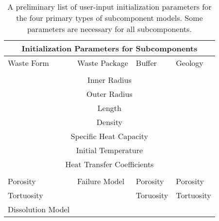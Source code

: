 %
\begin{table}
  \centering
  \footnotesize{
  \begin{tabularx}{\textwidth}{|l|l|l|l|}
    \multicolumn{4}{c}{\textbf{Initialization Parameters for Subcomponents}}\\
    \hline
    Waste Form & Waste Package & Buffer & Geology \\
    \hline
    \multicolumn{4}{|c|}{}\\
    \multicolumn{4}{|c|}{Inner Radius}\\
    \multicolumn{4}{|c|}{Outer Radius}\\
    \multicolumn{4}{|c|}{Length}\\
    \multicolumn{4}{|c|}{Density}\\
    \multicolumn{4}{|c|}{Specific Heat Capacity}\\
    \multicolumn{4}{|c|}{Initial Temperature}\\
    \multicolumn{4}{|c|}{Heat Transfer Coefficients}\\
    \multicolumn{4}{|c|}{}\\
    \hline
    Porosity           &  Failure Model & Porosity & Porosity \\
    Tortuosity         &                & Toruosity & Tortuosity \\
    Dissolution Model  &                &           &  \\
    \hline
  \end{tabularx}
  \caption[Initialization Parameters for Subcomponents]{A preliminary list of 
  user-input initialization parameters for the four primary types of 
  subcomponent models. Some parameters are necessary for all subcomponents.}
  \label{tab:params}
  }
\end{table}


